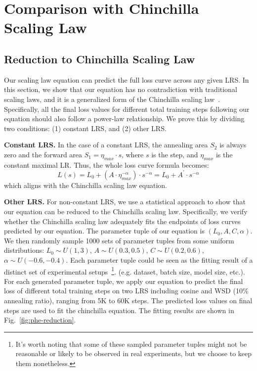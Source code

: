 \section{Comparison with Chinchilla Scaling Law}
\label{sec:comparison}

\subsection{Reduction to Chinchilla Scaling Law}
Our scaling law equation can predict the full loss curve across any given LRS. In this section, we show    
that our equation has no contradiction with traditional scaling laws, and it is a generalized form of the Chinchilla scaling law~\citep{hoffmann2022training}. Specifically, all the final loss values for different total training steps following our equation should also follow a power-law relationship. We prove this by dividing two conditions: (1) constant LRS, and (2) other LRS.


\noindent \textbf{Constant LRS.} In the case of a constant LRS, the annealing area $S_2$ is always zero and the forward area $S_1 = \eta_{max} \cdot s$, where $s$ is the step, and $\eta_{max}$ is the constant maximal LR. Thus, the whole loss curve formula becomes:
\begin{equation}
L(s) = L_0 + (A\cdot \eta_{max}^{-\alpha})  \cdot s^{-\alpha} =  L_0 + A^{\prime} \cdot s^{-\alpha} 
\end{equation}
which aligns with the Chinchilla scaling law equation. 


\noindent \textbf{Other LRS.} For non-constant LRS, we use a statistical approach to show that our equation can be reduced to the Chinchilla scaling law. 
Specifically, we verify whether the Chinchilla scaling law adequately fits the endpoints of loss curves predicted by our equation.
The parameter tuple of our equation is $(L_{0}, A, C, \alpha)$. We then randomly sample 1000 sets of parameter tuples from some uniform distributions:
$L_0\sim U(1,3)$, $A\sim U(0.3,0.5)$, $C\sim U(0.2,0.6)$,  $\alpha\sim U(-0.6,-0.4)$.
Each parameter tuple could be seen as the fitting result of a distinct set of experimental setups~\footnote{It's worth noting that some of these sampled parameter tuples might not be reasonable or likely to be observed in real experiments, but we choose to keep them nonetheless.}. (e.g. dataset, batch size, model size, etc.).
For each generated parameter tuple, we apply our equation to predict the final loss of different total training steps on two LRS including cosine and WSD (10\% annealing ratio), 
ranging from 5K to 60K steps. 
The predicted loss values on final steps are used to fit the chinchilla equation. 
The fitting results are shown in Fig.~\ref{fig:phe-reduction}.

